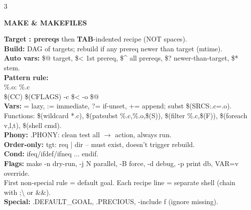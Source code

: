 \documentclass[10pt,letterpaper]{article}
\newenvironment{topic}[1]{%
  \par\addvspace{1.5pt}%
  \noindent\colorbox{hdrBG}{%
    \begin{minipage}{\dimexpr\linewidth-2\fboxsep\relax}%
      \centering\bfseries\sffamily\fontsize{6pt}{7pt}\selectfont\color{hdrFG}\MakeUppercase{#1}%
    \end{minipage}%
  }\par\nobreak\vskip0.5pt%
  \begingroup\setlength{\leftskip}{0pt}\setlength{\rightskip}{0pt}%
}{%
  \endgroup\par\addvspace{0.5pt}%
}
\newcommand{\warn}[1]{\textcolor{warnC}{\textbf{#1}}}
\newcommand{\hd}[1]{\textcolor{accent}{\textbf{#1}}}
\newcommand{\cn}[1]{{\ttfamily\small #1}}
\begin{document}
\begin{multicols*}{3}
\begin{topic}{Make \& Makefiles}
\hd{Target : prereqs} then \warn{TAB}-indented recipe (NOT spaces).\\
\hd{Build:} DAG of targets; rebuild if any prereq newer than target (mtime).\\
\hd{Auto vars:} \cn{\$@} target, \cn{\$<} 1st prereq, \cn{\$\textasciicircum} all prereqs, \cn{\$?} newer-than-target, \cn{\$*} stem.\\
\hd{Pattern rule:}\\
\cn{\%.o: \%.c}\\
\cn{\hspace*{1em}\$(CC) \$(CFLAGS) -c \$< -o \$@}\\
\hd{Vars:} \cn{=} lazy, \cn{:=} immediate, \cn{?=} if-unset, \cn{+=} append; subst \cn{\$(SRCS:.c=.o)}. Functions: \cn{\$(wildcard *.c)}, \cn{\$(patsubst \%.c,\%.o,\$(S))}, \cn{\$(filter \%.c,\$(F))}, \cn{\$(foreach v,l,t)}, \cn{\$(shell cmd)}.\\
\hd{Phony:} \cn{.PHONY: clean test all} $\to$ action, always run.\\
\hd{Order-only:} \cn{tgt: req | dir} -- must exist, doesn't trigger rebuild.\\
\hd{Cond:} \cn{ifeq/ifdef/ifneq ... endif}.\\
\hd{Flags:} \cn{make -n} dry-run, \cn{-j N} parallel, \cn{-B} force, \cn{-d} debug, \cn{-p} print db, \cn{VAR=v} override.\\
First non-special rule = default goal. Each recipe line = separate shell (chain with \cn{;\textbackslash} or \cn{\&\&}).\\
\hd{Special:} \cn{.DEFAULT\_GOAL}, \cn{.PRECIOUS}, \cn{-include f} (ignore missing).
\end{topic}


\end{multicols*}
\end{document}
